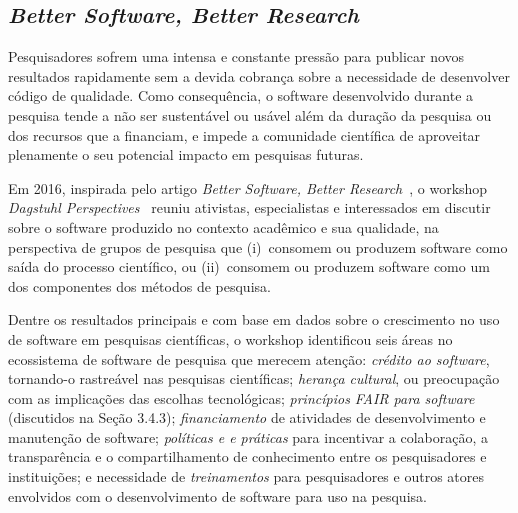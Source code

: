 \subsection{\textit{Better Software, Better Research}}



Pesquisadores sofrem uma intensa e constante pressão para publicar novos resultados rapidamente sem a devida cobrança sobre a necessidade de desenvolver código de qualidade. Como consequência, o software desenvolvido durante a pesquisa tende a não ser sustentável ou usável além da duração da pesquisa ou dos recursos que a  financiam, e impede a comunidade científica de aproveitar plenamente o seu potencial impacto em pesquisas futuras.

Em 2016, inspirada pelo artigo 
\textit{Better Software, Better Research}~\cite{goble2014better}, 
o workshop \textit{Dagstuhl Perspectives}~\cite{goble_et_al:DR:2016:6755} reuniu ativistas, especialistas e interessados em discutir sobre o software produzido no contexto acadêmico e sua qualidade, na perspectiva de grupos de pesquisa que (i)~consomem ou produzem software como saída do processo científico, ou (ii)~consomem ou produzem software como um dos componentes dos métodos de pesquisa.

Dentre os resultados principais e com base em dados sobre o crescimento no uso de software em pesquisas científicas,
o workshop identificou seis áreas no ecossistema de software de pesquisa que merecem atenção: 
\textit{crédito ao software}, tornando-o rastreável nas pesquisas científicas; \textit{herança cultural}, ou preocupação com as implicações das escolhas tecnológicas; \textit{princípios FAIR para software} (discutidos na Seção 3.4.3); \textit{financiamento} de atividades de desenvolvimento e manutenção de software; \textit{políticas e e práticas} para incentivar a colaboração, a transparência e o compartilhamento de conhecimento entre os pesquisadores e instituições; e necessidade de \textit{treinamentos} para pesquisadores e outros atores envolvidos com o desenvolvimento de software para uso na pesquisa.

